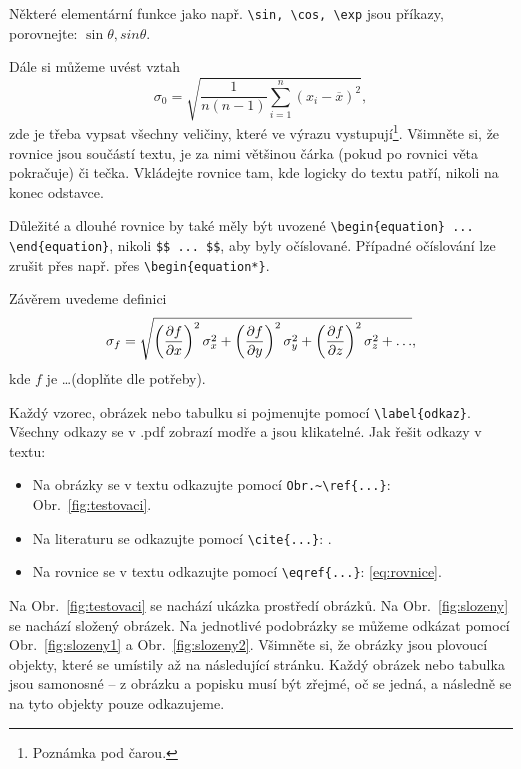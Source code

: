 				 
		Některé elementární funkce jako např. \verb|\sin, \cos, \exp| jsou příkazy, porovnejte: $\sin\theta, sin\theta$.
		
		Dále si můžeme uvést vztah
	\begin{equation} \label{eq:chyba_aritmetickeho_prumeru}
	\sigma_0 = \sqrt{\frac{1}{n(n-1)} \sum_{i=1}^{n}\left( x_i - \overline{x} \right)^2 },
	\end{equation}
		zde je třeba vypsat všechny veličiny, které ve výrazu vystupují\footnote{Poznámka pod čarou.}. Všimněte si, že rovnice jsou součástí textu, je za nimi většinou čárka (pokud po rovnici věta pokračuje) či tečka. Vkládejte rovnice tam, kde logicky do textu patří, nikoli na konec odstavce.
		
		Důležité a dlouhé rovnice by také měly být uvozené \verb|\begin{equation} ... \end{equation}|, nikoli \verb|$$ ... $$|, aby byly očíslované. Případné očíslování lze zrušit přes např. přes \verb|\begin{equation*}|.
			
		Závěrem uvedeme definici
			\begin{equation}\label{eq:chyba_neprime_mereni}
			\sigma_f = \sqrt{\left( \pdv{f}{x} \right)^2 \sigma^2_x + \left( \pdv{f}{y} \right)^2 \sigma^2_y + \left(\pdv{f}{z} \right)^2 \sigma^2_z + \ldots},
			\end{equation}
			kde $f$ je \dots (doplňte dle potřeby).
			
			Každý vzorec, obrázek nebo tabulku si pojmenujte pomocí \verb|\label{odkaz}|. Všechny odkazy se v .pdf zobrazí modře a jsou klikatelné.  Jak řešit odkazy v textu:
	\begin{itemize}
	\item Na obrázky se v textu odkazujte pomocí \verb|Obr.~\ref{...}|: Obr.~\ref{fig:testovaci}.
						
	\item Na literaturu se odkazujte pomocí \verb|\cite{...}|: \cite{bib:zadani}.
						
	\item Na rovnice se v textu odkazujte pomocí \verb|\eqref{...}|: \eqref{eq:rovnice}.
						 
	\end{itemize}			
			
		Na Obr.~\ref{fig:testovaci} se nachází ukázka prostředí obrázků. Na Obr.~\ref{fig:slozeny} se nachází složený obrázek. Na jednotlivé podobrázky se můžeme odkázat pomocí Obr.~\ref{fig:slozeny1} a Obr.~\ref{fig:slozeny2}. Všimněte si, že obrázky jsou plovoucí objekty, které se umístily až na následující stránku. Každý obrázek nebo tabulka jsou samonosné -- z obrázku a popisku musí být zřejmé, oč se jedná, a následně se na tyto objekty pouze odkazujeme.
		
